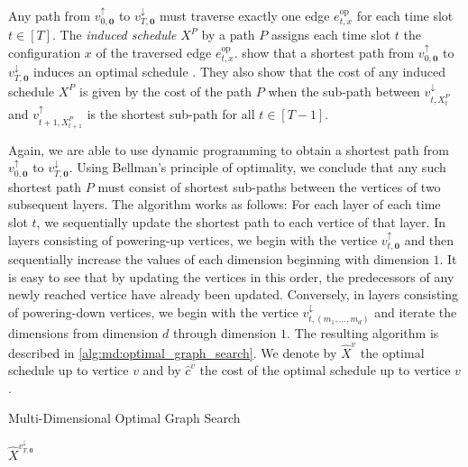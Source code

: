 Any path from $v_{0,\mathbf{0}}^{\uparrow}$ to $v_{T,\mathbf{0}}^{\downarrow}$ must traverse exactly one edge $e_{t,x}^{\text{op}}$ for each time slot $t \in [T]$. The \emph{induced schedule} $X^P$ by a path $P$ assigns each time slot $t$ the configuration $x$ of the traversed edge $e_{t,x}^{\text{op}}$. \citeauthor*{Albers2021_2} show that a shortest path from $v_{0,\mathbf{0}}^{\uparrow}$ to $v_{T,\mathbf{0}}^{\downarrow}$ induces an optimal schedule \cite{Albers2021_2}. They also show that the cost of any induced schedule $X^P$ is given by the cost of the path $P$ when the sub-path between $v_{t,X_t^P}^{\downarrow}$ and $v_{t+1,X_{t+1}^P}^{\uparrow}$ is the shortest sub-path for all $t \in [T-1]$.

Again, we are able to use dynamic programming to obtain a shortest path from $v_{0,\mathbf{0}}^{\uparrow}$ to $v_{T,\mathbf{0}}^{\downarrow}$. Using Bellman's principle of optimality, we conclude that any such shortest path $P$ must consist of shortest sub-paths between the vertices of two subsequent layers. The algorithm works as follows: For each layer of each time slot $t$, we sequentially update the shortest path to each vertice of that layer. In layers consisting of powering-up vertices, we begin with the vertice $v_{t,\mathbf{0}}^{\uparrow}$ and then sequentially increase the values of each dimension beginning with dimension $1$. It is easy to see that by updating the vertices in this order, the predecessors of any newly reached vertice have already been updated. Conversely, in layers consisting of powering-down vertices, we begin with the vertice $v_{t,(m_1,\dots,m_d)}^{\downarrow}$ and iterate the dimensions from dimension $d$ through dimension $1$. The resulting algorithm is described in \autoref{alg:md:optimal_graph_search}. We denote by $\hat{X}^v$ the optimal schedule up to vertice $v$ and by $\hat{c}^v$ the cost of the optimal schedule up to vertice $v$.

\begin{algorithm}
    \caption{Multi-Dimensional Optimal Graph Search \cite{Albers2021_2}}\label{alg:md:optimal_graph_search}
    \Return $\hat{X}^{v_{T,\mathbf{0}}^{\downarrow}}$\;
\end{algorithm}

